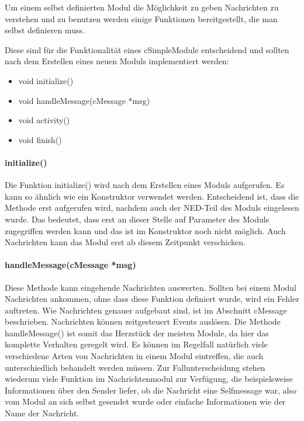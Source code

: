 Um einem selbst definierten Modul die Möglichkeit zu geben Nachrichten zu verstehen und zu benutzen werden einige Funktionen bereitgestellt, die man selbst definieren muss.

Diese sind für die Funktionalität eines cSimpleModule entscheidend und sollten nach dem Erstellen eines neuen Moduls implementiert werden:

\begin{itemize}
\item void initialize()
\item void handleMessage(cMessage *msg)
\item void activity()
\item void finish()
\end{itemize}

\paragraph{initialize()}

Die Funktion initialize() wird nach dem Erstellen eines Moduls aufgerufen. Es kann so ähnlich wie ein Konstruktor verwendet werden. Entscheidend ist, dass die Methode erst aufgerufen wird, nachdem auch der NED-Teil des Moduls eingelesen wurde. Das bedeutet, dass erst an dieser Stelle auf Parameter des Moduls zugegriffen werden kann und das ist im Konstruktor noch nicht möglich. Auch Nachrichten kann das Modul erst ab diesem Zeitpunkt verschicken.

\paragraph{handleMessage(cMessage *msg)}

Diese Methode kann eingehende Nachrichten auswerten. Sollten bei einem Modul Nachrichten ankommen, ohne dass diese Funktion definiert wurde, wird ein Fehler auftreten. Wie Nachrichten genauer aufgebaut sind, ist im Abschnitt cMessage beschrieben.
Nachrichten können zeitgesteuert Events auslösen. Die Methode handleMessage() ist somit das Herzstück der meisten Module, da hier das komplette Verhalten geregelt wird. \newline
Es können im Regelfall natürlich viele verschiedene Arten von Nachrichten in einem Modul eintreffen, die auch unterschiedlich behandelt werden müssen. Zur Fallunterscheidung stehen wiederum viele Funktion im Nachrichtenmodul zur Verfügung, die beispielsweise Informationen über den Sender liefer, ob die Nachricht eine Selfmessage war, also vom Modul an sich selbst gesendet wurde oder einfache Informationen wie der Name der Nachricht.

